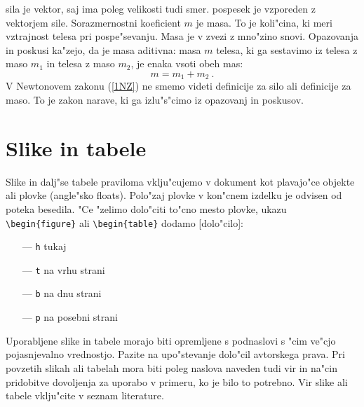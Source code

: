 \ac{sila} je vektor, saj ima poleg velikosti tudi smer. 
\ac{pospesek} je vzporeden z vektorjem sile. 
Sorazmernostni koeficient  $m$ je masa.  To je koli"cina, ki meri vztrajnost telesa pri pospe"sevanju. 
Masa je v zvezi z mno"zino snovi.  Opazovanja in poskusi ka"zejo, da je masa aditivna: 
masa $m$ telesa, ki ga sestavimo iz telesa z maso $m_1$ in telesa z maso $m_2$, je enaka vsoti obeh mas:
$$
m = m_1 + m_2 \>.
$$
V Newtonovem zakonu (\ref{1NZ}) ne smemo videti definicije za silo ali definicije za maso. 
To je zakon narave, ki ga izlu"s"cimo iz opazovanj in poskusov.

%
\chapter{Slike in tabele}
\label{chSl}

Slike in dalj"se tabele praviloma vklju"cujemo v dokument kot plavajo"ce objekte ali plovke (angle"sko floats).
Polo"zaj plovke v kon"cnem izdelku je odvisen od poteka besedila.
"Ce "zelimo dolo"citi to"cno mesto plovke, ukazu \verb|\begin{figure}|
ali \verb|\begin{table}| dodamo [dolo"cilo]:

\begin{itemize}
\item[---]{{\tt h} \hspace{1 cm} tukaj}
\item[---]{{\tt t} \hspace{1 cm} na vrhu strani}
\item[---]{{\tt b} \hspace{1 cm} na dnu strani}
\item[---]{{\tt p} \hspace{1 cm} na posebni strani}
\end{itemize}

\noindent
Uporabljene slike in tabele morajo biti opremljene s podnaslovi s "cim ve"cjo pojasnjevalno vrednostjo. 
Pazite na upo"stevanje dolo"cil avtorskega prava. Pri povzetih slikah ali tabelah mora biti poleg naslova
naveden tudi vir in na"cin pridobitve dovoljenja za uporabo v primeru, ko je bilo to potrebno. 
Vir slike ali tabele vklju"cite v seznam literature.

